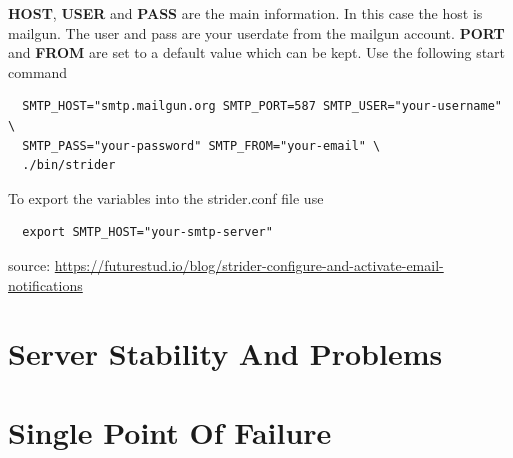 \textbf{HOST}, \textbf{USER} and \textbf{PASS} are the main information. In this case the host is mailgun. The user and pass are your userdate
from the mailgun account. \textbf{PORT} and \textbf{FROM} are set to a default value which can be kept. Use the following start command

\begin{lstlisting}
  SMTP_HOST="smtp.mailgun.org SMTP_PORT=587 SMTP_USER="your-username" \
  SMTP_PASS="your-password" SMTP_FROM="your-email" \
  ./bin/strider
\end{lstlisting}

To export the variables into the strider.conf file use

\begin{lstlisting}
  export SMTP_HOST="your-smtp-server"
\end{lstlisting}

source: \url{https://futurestud.io/blog/strider-configure-and-activate-email-notifications}

\newpage
\section{Server Stability And Problems}
\label{section:Server Stability And Problems}


\newpage
\section{Single Point Of Failure}
\label{section:Single Point Of Failure}











%
%
%
%
%
%
